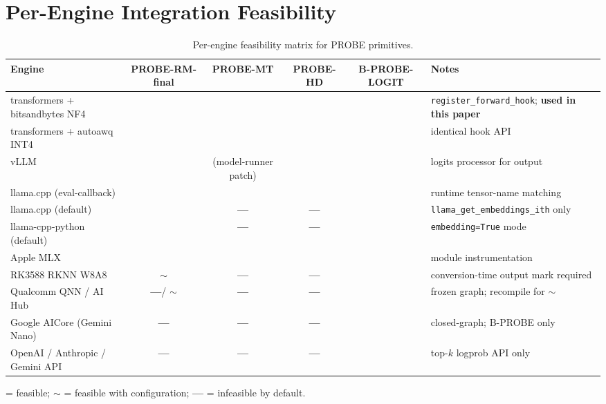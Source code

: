 \documentclass[11pt,a4paper]{article}
\newcommand{\YES}{\textcolor{green!50!black}{\textbf{\checkmark}}}
\newcommand{\NO}{\textcolor{red!60!black}{\textbf{---}}}
\newcommand{\PART}{\textcolor{orange!70!black}{\textbf{$\sim$}}}
\begin{document}
\section{Per-Engine Integration Feasibility}
\label{sec:integration}

\begin{table}[H]
  \centering
  \small
  \caption{Per-engine feasibility matrix for PROBE primitives.}
  \label{tab:engines}
  \begin{tabularx}{\textwidth}{@{}Xccccl@{}}
    \toprule
    Engine & PROBE-RM-final & PROBE-MT & PROBE-HD & B-PROBE-LOGIT & Notes \\
    \midrule
    transformers + bitsandbytes NF4 & \YES & \YES & \YES & \YES & \texttt{register\_forward\_hook}; \textbf{used in this paper} \\
    transformers + autoawq INT4 & \YES & \YES & \YES & \YES & identical hook API \\
    vLLM & \YES & \YES (model-runner patch) & \YES & \YES & logits processor for output \\
    llama.cpp (eval-callback) & \YES & \YES & \YES & \YES & runtime tensor-name matching \\
    llama.cpp (default) & \YES & \NO & \NO & \YES & \texttt{llama\_get\_embeddings\_ith} only \\
    llama-cpp-python (default) & \YES & \NO & \NO & \YES & \texttt{embedding=True} mode \\
    Apple MLX & \YES & \YES & \YES & \YES & module instrumentation \\
    RK3588 RKNN W8A8 & \PART & \NO & \NO & \YES & conversion-time output mark required \\
    Qualcomm QNN / AI Hub & \NO / \PART & \NO & \NO & \YES & frozen graph; recompile for \PART \\
    Google AICore (Gemini Nano) & \NO & \NO & \NO & \YES & closed-graph; B-PROBE only \\
    OpenAI / Anthropic / Gemini API & \NO & \NO & \NO & \YES & top-$k$ logprob API only \\
    \bottomrule
  \end{tabularx}
\end{table}

\noindent\YES{} = feasible; \PART{} = feasible with configuration; \NO{} = infeasible by default.

\end{document}
